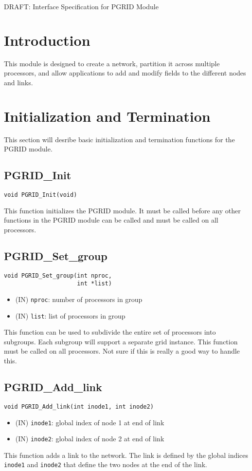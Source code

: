 \documentclass[12pt]{article}
\begin{document}
\begin{titlepage}
\begin{center}
{\LARGE DRAFT: Interface Specification for PGRID Module}
\end{center}
\end{titlepage}
\newpage
\pagestyle{plain}
\section{Introduction}
This module is designed to create a network, partition it across multiple
processors, and allow applications to add and modify fields to the different
nodes and links.
\section{Initialization and Termination}
This section will desribe basic initialization and termination functions for the
PGRID module.
\subsection{PGRID\_Init}
\begin{verbatim}
void PGRID_Init(void)
\end{verbatim}
This function initializes the PGRID module. It must be called before any other
functions in the PGRID module can be called and must be called on all
processors.
\subsection{PGRID\_Set\_group}
\begin{verbatim}
void PGRID_Set_group(int nproc,
                     int *list)
\end{verbatim}
\begin{itemize}
\item (IN) \texttt{nproc}: number of processors in group
\item (IN) \texttt{list}: list of processors in group
\end{itemize}
This function can be used to subdivide the entire set of processors into
subgroups. Each subgroup will support a separate grid instance. This function
must be called on all processors. Not sure if this is really a good way to
handle this.
\subsection{PGRID\_Add\_link}
\begin{verbatim}
void PGRID_Add_link(int inode1, int inode2)
\end{verbatim}
\begin{itemize}
\item (IN) \texttt{inode1}: global index of node 1 at end of link
\item (IN) \texttt{inode2}: global index of node 2 at end of link
\end{itemize}
This function adds a link to the network.  The link is defined by the global
indices \texttt{inode1} and \texttt{inode2} that define the two nodes at the
end of the link.
\end{document}
